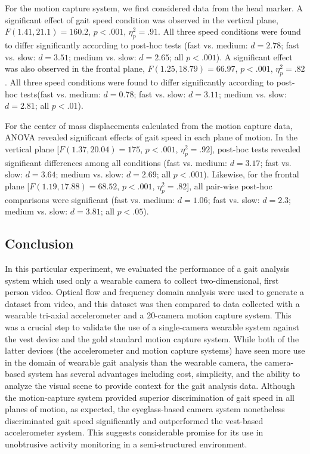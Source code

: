 \documentclass[12pt]{report}
\begin{document}
For the motion capture system, we first considered data from the head marker. A significant effect of gait speed condition was observed in the vertical plane, $F(1.41, 21.1) = 160.2$, $p < .001$, $\eta^2_p = .91$. All three speed conditions were found to differ significantly according to post-hoc tests (fast vs. medium: $d= 2.78$; fast vs. slow: $d= 3.51$; medium vs. slow: $d= 2.65$; all $p< .001$). A significant effect was also observed in the frontal plane, $F(1.25, 18.79) = 66.97$, $p < .001$, $\eta^2_p = .82$. All three speed conditions were found to differ significantly according to post-hoc tests(fast vs. medium: $d= 0.78$; fast vs. slow: $d= 3.11$; medium vs. slow: $d= 2.81$; all $p< .01$).
 
For the center of mass displacements calculated from the motion capture data, ANOVA revealed significant effects of gait speed in each plane of motion. In the vertical plane [$F(1.37,20.04) = 175$, $p < .001$, $\eta^2_p = .92$], post-hoc tests revealed significant differences among all conditions (fast vs. medium: $d= 3.17$; fast vs. slow: $d= 3.64$; medium vs. slow: $d= 2.69$; all $p< .001$). Likewise, for the frontal plane [$F(1.19,17.88) = 68.52$, $p< .001$, $\eta^2_p = .82$], all pair-wise post-hoc comparisons were significant (fast vs. medium: $d= 1.06$; fast vs. slow: $d= 2.3$; medium vs. slow: $d= 3.81$; all $p< .05$).

\subsection{Conclusion}
In this particular experiment, we evaluated the performance of a gait analysis system which used only a wearable camera to collect two-dimensional, first person video. Optical flow and frequency domain analysis were used to generate a dataset from video, and this dataset was then compared to data collected with a wearable tri-axial accelerometer and a 20-camera motion capture system. This was a crucial step to validate the use of a single-camera wearable system against the vest device and the gold standard motion capture system. While both of the latter devices (the accelerometer and motion capture systems) have seen more use in the domain of wearable gait analysis than the wearable camera, the camera-based system has several advantages including cost, simplicity, and the ability to analyze the visual scene to provide context for the gait analysis data. Although the motion-capture system provided superior discrimination of gait speed in all planes of motion, as expected, the eyeglass-based camera system nonetheless discriminated gait speed significantly and outperformed the vest-based accelerometer system. This suggests considerable promise for its use in unobtrusive activity monitoring in a semi-structured environment.
\end{document}
